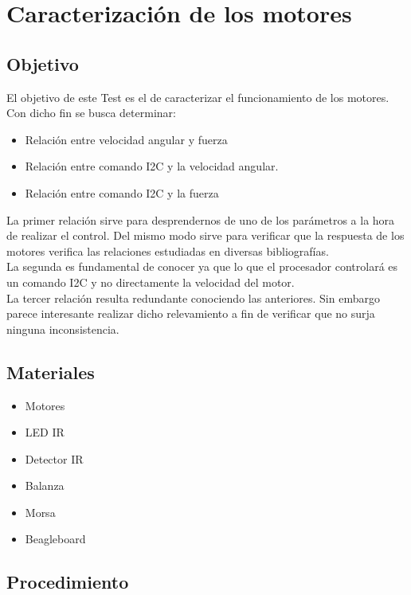 \documentclass[spanish,12pt,a4paper,titlepage]{report}
\begin{document}
\chapter{Caracterización de los motores}
\section{Objetivo}
El objetivo de este Test es el de caracterizar el funcionamiento de los motores. Con dicho fin se busca determinar:

\begin{itemize}
\item Relación entre velocidad angular y fuerza
\item Relación entre comando I2C y la velocidad angular.
\item Relación entre comando I2C y la fuerza
\end{itemize}

La primer relación sirve para desprendernos de uno de los parámetros a la hora de realizar el control. Del mismo modo sirve para verificar que la respuesta de los motores verifica las relaciones estudiadas en diversas bibliografías.\\

La segunda es fundamental de conocer ya que lo que el procesador controlará es un comando I2C y no directamente la velocidad del motor. \\

La tercer relación resulta redundante conociendo las anteriores. Sin embargo parece interesante realizar dicho relevamiento a fin de verificar que no surja ninguna inconsistencia. \\
\section{Materiales}
\begin{itemize}
\item Motores
\item LED IR
\item Detector IR
\item Balanza
\item Morsa
\item Beagleboard
\end{itemize}

\section{Procedimiento}
\end{document}
